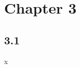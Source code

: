 \documentclass{article}
\begin{document}
\section*{Chapter 3} %
\label{sec:chapter_3}

\subsection*{3.1} %
\label{sub:3_1}
x




\end{document}
